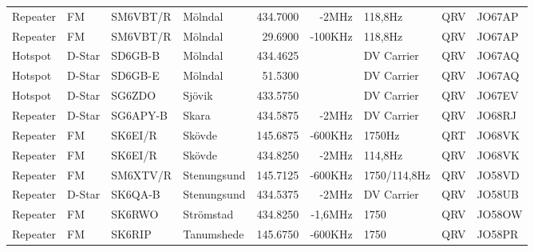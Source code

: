 \begin{landscape}
\begin{longtable}{llllrrlcl}
	Repeater                  & FM            & SM6VBT/R      & Mölndal             & 434.7000          & -2MHz          & 118,8Hz          & QRV             & JO67AP           \\
	Repeater                  & FM            & SM6VBT/R      & Mölndal             & 29.6900           & -100KHz        & 118,8Hz          & QRV             & JO67AP           \\
	Hotspot                   & D-Star        & SD6GB-B       & Mölndal             & 434.4625          &                & DV Carrier       & QRV             & JO67AQ           \\
	Hotspot                   & D-Star        & SD6GB-E       & Mölndal             & 51.5300           &                & DV Carrier       & QRV             & JO67AQ           \\
	Hotspot                   & D-Star        & SG6ZDO        & Sjövik              & 433.5750          &                & DV Carrier       & QRV             & JO67EV           \\
	Repeater                  & D-Star        & SG6APY-B      & Skara               & 434.5875          & -2MHz          & DV Carrier       & QRV             & JO68RJ           \\
	Repeater                  & FM            & SK6EI/R       & Skövde              & 145.6875          & -600KHz        & 1750Hz           & QRT             & JO68VK           \\
	Repeater                  & FM            & SK6EI/R       & Skövde              & 434.8250          & -2MHz          & 114,8Hz          & QRV             & JO68VK           \\
	Repeater                  & FM            & SM6XTV/R      & Stenungsund         & 145.7125          & -600KHz        & 1750/114,8Hz     & QRV             & JO58VD           \\
	Repeater                  & D-Star        & SK6QA-B       & Stenungsund         & 434.5375          & -2MHz          & DV Carrier       & QRV             & JO58UB           \\
	Repeater                  & FM            & SK6RWO        & Strömstad           & 434.8250          & -1,6MHz        & 1750             & QRV             & JO58OW           \\
	Repeater                  & FM            & SK6RIP        & Tanumshede          & 145.6750          & -600KHz        & 1750             & QRV             & JO58PR           \\

\end{longtable}
\end{landscape}
